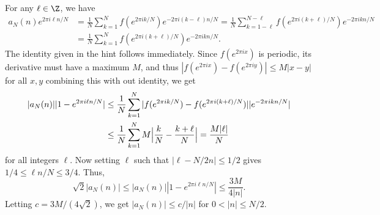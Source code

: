 \documentclass[11pt,letterpaper]{article}
\begin{document}
\begin{solution}
    \quad For any $\ell \in \Z$, we have 
    \[
        \begin{aligned}
            a_N(n)e^{2\pi i \ell n /N} &= \frac1N\sum_{k=1}^N f(e^{2\pi i k/N})e^{-2\pi i (k-\ell)n/N}=\frac1N\sum_{k=1-\ell}^{N-\ell}f(e^{2\pi i (k+\ell)/N})e^{-2\pi ikn/N} \\&= \frac1N\sum_{k=1}^Nf(e^{2\pi i (k+\ell)/N})e^{-2\pi i kn/N}.
        \end{aligned}
    \]
    The identity given in the hint follows immediately. Since $f(e^{2\pi i x})$ is periodic, its derivative must have a maximum $M$, and thus $|f(e^{2\pi i x})-f(e^{2\pi i y})| \leq M|x-y|$ for all $x,y$ combining this with out identity, we get
    \[
        \begin{aligned}
            |a_N(n)||1-e^{2\pi i \ell n/N}| &\leq \frac{1}{N}\sum_{k=1}^N|f(e^{2\pi i k/N})-f(e^{2\pi i(k+\ell)/N})||e^{-2\pi i kn/N}| \\
&\leq \frac{1}{N}\sum_{k=1}^NM\Bigl|\frac{k}{N}-\frac{k+\ell}{N}\Bigr| = \frac{M|\ell|}{N}
        \end{aligned}
    \] 
for all integers $\ell$. Now setting $\ell$ such that $|\ell-N /2n| \leq 1 /2$ gives $1 /4 \leq \ell n / N\leq 3 / 4$. Thus, 
\[
\sqrt{2}|a_N(n)| \leq |a_N(n)||1-e^{2\pi i \ell n/N}| \leq \frac{3M}{4|n|}.
\]
Letting $c = 3M/(4\sqrt{2})$, we get $|a_N(n)| \leq c/|n|$ for $0 < |n| \leq N/2$.
\end{solution}
\end{document}
